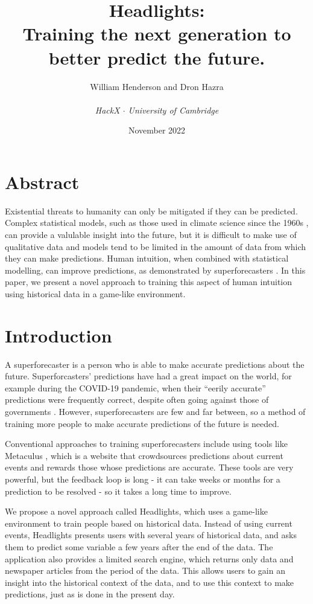 \documentclass{article}
\title{\textbf{Headlights}: \\
Training the next generation to \\
better predict the future.}
\author{William Henderson and Dron Hazra \\
\\
\textit{HackX $\cdot$ University of Cambridge}
}
\date{November 2022}
\begin{document}
\maketitle

\section{Abstract}

Existential threats to humanity can only be mitigated if they can be predicted. Complex statistical models, such as those used in climate science since the 1960s \cite{noaa}, can provide a valulable insight into the future, but it is difficult to make use of qualitative data and models tend to be limited in the amount of data from which they can make predictions. Human intuition, when combined with statistical modelling, can improve predictions, as demonstrated by superforecasters \cite{superforecasters}. In this paper, we present a novel approach to training this aspect of human intuition using historical data in a game-like environment.

\section{Introduction}

A superforecaster is a person who is able to make accurate predictions about the future. Superforcasters' predictions have had a great impact on the world, for example during the COVID-19 pandemic, when their ``eerily accurate'' predictions were frequently correct, despite often going against those of governments \cite{covid19}. However, superforecasters are few and far between, so a method of training more people to make accurate predictions of the future is needed.

Conventional approaches to training superforecasters include using tools like Metaculus \cite{metaculus}, which is a website that crowdsources predictions about current events and rewards those whose predictions are accurate. These tools are very powerful, but the feedback loop is long - it can take weeks or months for a prediction to be resolved - so it takes a long time to improve.

We propose a novel approach called Headlights, which uses a game-like environment to train people based on historical data. Instead of using current events, Headlights presents users with several years of historical data, and asks them to predict some variable a few years after the end of the data. The application also provides a limited search engine, which returns only data and newspaper articles from the period of the data. This allows users to gain an insight into the historical context of the data, and to use this context to make predictions, just as is done in the present day.
\end{document}
